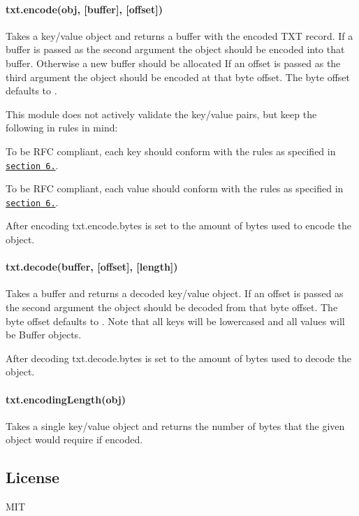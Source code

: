 \paragraph*{{\ttfamily txt.\+encode(obj, \mbox{[}buffer\mbox{]}, \mbox{[}offset\mbox{]})}}

Takes a key/value object and returns a buffer with the encoded T\+XT record. If a buffer is passed as the second argument the object should be encoded into that buffer. Otherwise a new buffer should be allocated If an offset is passed as the third argument the object should be encoded at that byte offset. The byte offset defaults to {}.

This module does not actively validate the key/value pairs, but keep the following in rules in mind\+:


\begin{DoxyItemize}
\item To be R\+FC compliant, each key should conform with the rules as specified in \href{https://tools.ietf.org/html/rfc6763#section-6.4}{\tt section 6.}.
\item To be R\+FC compliant, each value should conform with the rules as specified in \href{https://tools.ietf.org/html/rfc6763#section-6.5}{\tt section 6.}.
\end{DoxyItemize}

After encoding {\ttfamily txt.\+encode.\+bytes} is set to the amount of bytes used to encode the object.

\paragraph*{{\ttfamily txt.\+decode(buffer, \mbox{[}offset\mbox{]}, \mbox{[}length\mbox{]})}}

Takes a buffer and returns a decoded key/value object. If an offset is passed as the second argument the object should be decoded from that byte offset. The byte offset defaults to {}. Note that all keys will be lowercased and all values will be Buffer objects.

After decoding {\ttfamily txt.\+decode.\+bytes} is set to the amount of bytes used to decode the object.

\paragraph*{{\ttfamily txt.\+encoding\+Length(obj)}}

Takes a single key/value object and returns the number of bytes that the given object would require if encoded.

\subsection*{License}

M\+IT 